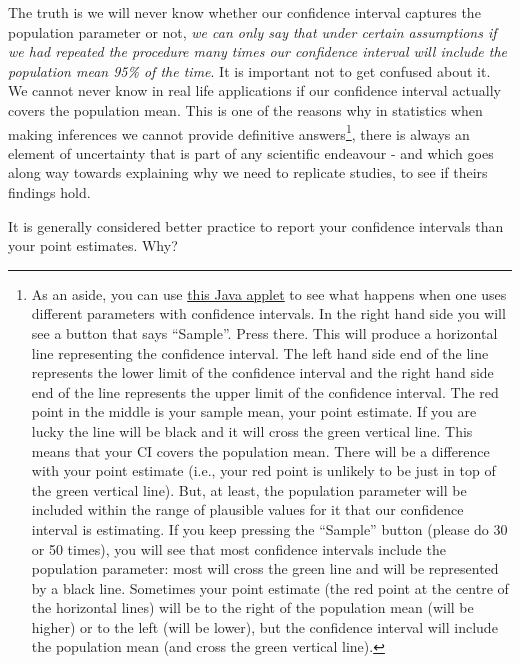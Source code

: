 \documentclass[
]{book}
\begin{document}
The truth is we will never know whether our confidence interval captures the population parameter or not, \emph{we can only say that under certain assumptions if we had repeated the procedure many times our confidence interval will include the population mean 95\% of the time}. It is important not to get confused about it. We cannot never know in real life applications if our confidence interval actually covers the population mean. This is one of the reasons why in statistics when making inferences we cannot provide definitive answers\footnote{As an aside, you can use \href{https://digitalfirst.bfwpub.com/stats_applet/stats_applet_4_ci.html}{this Java applet} to see what happens when one uses different parameters with confidence intervals. In the right hand side you will see a button that says ``Sample''. Press there. This will produce a horizontal line representing the confidence interval. The left hand side end of the line represents the lower limit of the confidence interval and the right hand side end of the line represents the upper limit of the confidence interval. The red point in the middle is your sample mean, your point estimate. If you are lucky the line will be black and it will cross the green vertical line. This means that your CI covers the population mean. There will be a difference with your point estimate (i.e., your red point is unlikely to be just in top of the green vertical line). But, at least, the population parameter will be included within the range of plausible values for it that our confidence interval is estimating. If you keep pressing the ``Sample'' button (please do 30 or 50 times), you will see that most confidence intervals include the population parameter: most will cross the green line and will be represented by a black line. Sometimes your point estimate (the red point at the centre of the horizontal lines) will be to the right of the population mean (will be higher) or to the left (will be lower), but the confidence interval will include the population mean (and cross the green vertical line).}, there is always an element of uncertainty that is part of any scientific endeavour - and which goes along way towards explaining why we need to replicate studies, to see if theirs findings hold.

It is generally considered better practice to report your confidence intervals than your point estimates. Why?
\end{document}
